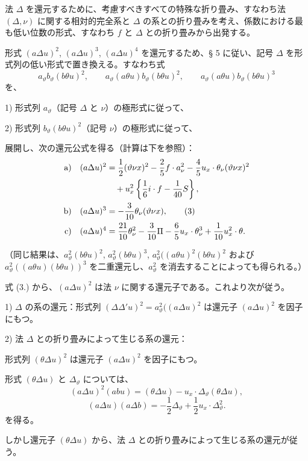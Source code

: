 \documentclass[11pt]{jlreq}
\newcommand{\A}{\Delta}
\begin{document}
法 $\A$ を還元するために、考慮すべきすべての特殊な折り畳み、すなわち法 $(\A,\nu)$ に関する相対的完全系と $\A$ の系との折り畳みを考え、係数における最も低い位数の形式、すなわち $f$ と $\A$ との折り畳みから出発する。

形式 $(a\A u)^2$, $(a\A u)^3$, $(a\A u)^4$ を還元するため、§ 5 に従い、記号 $\A$ を形式列の低い形式で置き換える。すなわち式
\[
a_\vartheta b_\vartheta(b\theta u)^2,\qquad
a_\vartheta(a\theta u)b_\vartheta(b\theta u)^2,\qquad
a_\vartheta(a\theta u)b_\vartheta(b\theta u)^3
\]
を、

1) 形式列 $a_\vartheta$（記号 $\A$ と $\nu$）の極形式に従って、

2) 形式列 $b_\vartheta(b\theta u)^2$（記号 $\nu$）の極形式に従って、

展開し、次の還元公式を得る（計算は下を参照）：
\begin{align}
\text{a)}\quad (a\A u)^2
&=\frac12(\vartheta\nu x)^2-\frac25 f\cdot a_\nu^2
-\frac45u_x\cdot\theta_\nu(\vartheta\nu x)^2 \notag\\
&\quad+u_x^2\left\{\frac16 i\cdot f-\frac1{40}S\right\},\notag\\
\text{b)}\quad (a\A u)^3
&=-\frac3{10}\theta_\nu(\vartheta\nu x),\tag{3}\\
\text{c)}\quad (a\A u)^4
&=\frac{21}{10}\theta_\nu^2-\frac3{10}\Pi
-\frac65u_x\cdot\theta_\nu^3+\frac1{10}u_x^2\cdot\theta .\notag
\end{align}

（同じ結果は、$a_\vartheta^2(b\theta u)^2$, $a_\vartheta^2(b\theta u)^3$, $a_\vartheta^2((a\theta u)^2(b\theta u)^2$ および $a_\vartheta^2((a\theta u)(b\theta u))^3$ を二重還元し、$a_\vartheta^2$ を消去することによっても得られる。）

式 (3.) から、$(a\A u)^2$ は法 $\nu$ に関する還元子である。これより次が従う。

1) $\A$ の系の還元：形式列 $(\A\A' u)^2=a_\vartheta^2((a\A u)^2$ は還元子 $(a\A u)^2$ を因子にもつ。

2) 法 $\A$ との折り畳みによって生じる系の還元：

形式列 $(\theta\A u)^2$ は還元子 $(a\A u)^2$ を因子にもつ。

形式 $(\theta\A u)$ と $\A_\vartheta$ については、
\[
(a\A u)^2(abu)=(\theta\A u)-u_x\cdot\A_\vartheta(\theta\A u),
\]
\[
(a\A u)(a\A b)=-\frac12\A_\vartheta+\frac12u_x\cdot\A_\vartheta^2.
\]
を得る。

しかし還元子 $(\theta\A u)$ から、法 $\A$ との折り畳みによって生じる系の還元が従う。

\bigskip
\end{document}
